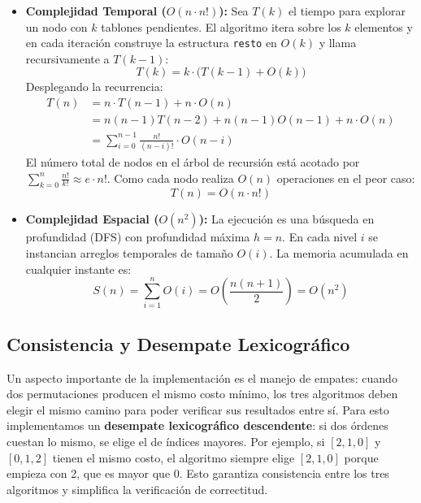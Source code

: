 \documentclass[conference, a4paper]{IEEEtran}
\begin{document}
\begin{itemize}
    \item \textbf{Complejidad Temporal ($O(n \cdot n!)$):} Sea $T(k)$ el tiempo para explorar un nodo con $k$ tablones pendientes. El algoritmo itera sobre los $k$ elementos y en cada iteración construye la estructura \texttt{resto} en $O(k)$ y llama recursivamente a $T(k-1)$:
    \begin{equation}
    T(k) = k \cdot \Big( T(k-1) + O(k) \Big)
    \end{equation}
    Desplegando la recurrencia:
    \begin{align*}
    T(n) &= n \cdot T(n-1) + n \cdot O(n) \\
         &= n(n-1)T(n-2) + n(n-1)O(n-1) + n \cdot O(n) \\
         &= \sum_{i=0}^{n-1} \frac{n!}{(n-i)!} \cdot O(n-i)
    \end{align*}
    El número total de nodos en el árbol de recursión está acotado por $\sum_{k=0}^n \frac{n!}{k!} \approx e \cdot n!$. Como cada nodo realiza $O(n)$ operaciones en el peor caso:
    \begin{equation}
    T(n) = O(n \cdot n!)
    \end{equation}
    
    \item \textbf{Complejidad Espacial ($O(n^2)$):} La ejecución es una búsqueda en profundidad (DFS) con profundidad máxima $h = n$. En cada nivel $i$ se instancian arreglos temporales de tamaño $O(i)$. La memoria acumulada en cualquier instante es:
    \begin{equation}
    S(n) = \sum_{i=1}^{n} O(i) = O\left( \frac{n(n+1)}{2} \right) = O(n^2)
    \end{equation}
\end{itemize}

\subsection{Consistencia y Desempate Lexicográfico}
Un aspecto importante de la implementación es el manejo de empates: cuando dos permutaciones producen el mismo costo mínimo, los tres algoritmos deben elegir el mismo camino para poder verificar sus resultados entre sí. Para esto implementamos un \textbf{desempate lexicográfico descendente}: si dos órdenes cuestan lo mismo, se elige el de índices mayores. Por ejemplo, si $[2, 1, 0]$ y $[0, 1, 2]$ tienen el mismo costo, el algoritmo siempre elige $[2, 1, 0]$ porque empieza con 2, que es mayor que 0. Esto garantiza consistencia entre los tres algoritmos y simplifica la verificación de correctitud.
\end{document}
